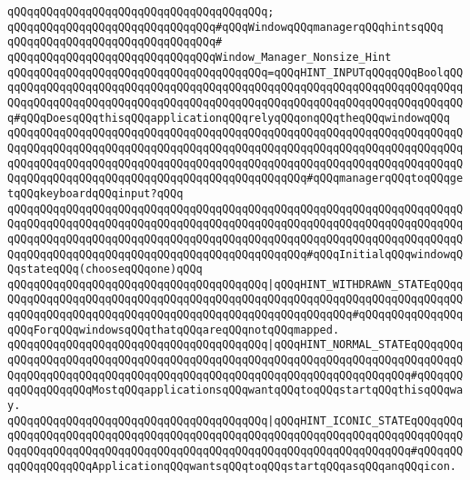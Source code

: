 \verb|qQQqqQQqqQQqqQQqqQQqqQQqqQQqqQQqqQQqqQQq;|\newline
\newline
\newline
\verb|qQQqqQQqqQQqqQQqqQQqqQQqqQQqqQQq#qQQqWindowqQQqmanagerqQQqhintsqQQq|\newline
\verb|qQQqqQQqqQQqqQQqqQQqqQQqqQQqqQQq#|\newline
\verb|qQQqqQQqqQQqqQQqqQQqqQQqqQQqqQQqWindow_Manager_Nonsize_Hint|\newline
\verb|qQQqqQQqqQQqqQQqqQQqqQQqqQQqqQQqqQQqqQQq=qQQqHINT_INPUTqQQqqQQqBoolqQQqqQQqqQQqqQQqqQQqqQQqqQQqqQQqqQQqqQQqqQQqqQQqqQQqqQQqqQQqqQQqqQQqqQQqqQQqqQQqqQQqqQQqqQQqqQQqqQQqqQQqqQQqqQQqqQQqqQQqqQQqqQQqqQQqqQQqqQQqqQQq#qQQqDoesqQQqthisqQQqapplicationqQQqrelyqQQqonqQQqtheqQQqwindowqQQq|\newline
\verb|qQQqqQQqqQQqqQQqqQQqqQQqqQQqqQQqqQQqqQQqqQQqqQQqqQQqqQQqqQQqqQQqqQQqqQQqqQQqqQQqqQQqqQQqqQQqqQQqqQQqqQQqqQQqqQQqqQQqqQQqqQQqqQQqqQQqqQQqqQQqqQQqqQQqqQQqqQQqqQQqqQQqqQQqqQQqqQQqqQQqqQQqqQQqqQQqqQQqqQQqqQQqqQQqqQQqqQQqqQQqqQQqqQQqqQQqqQQqqQQqqQQqqQQqqQQqqQQq#qQQqmanagerqQQqtoqQQqgetqQQqkeyboardqQQqinput?qQQq|\newline
\verb|qQQqqQQqqQQqqQQqqQQqqQQqqQQqqQQqqQQqqQQqqQQqqQQqqQQqqQQqqQQqqQQqqQQqqQQqqQQqqQQqqQQqqQQqqQQqqQQqqQQqqQQqqQQqqQQqqQQqqQQqqQQqqQQqqQQqqQQqqQQqqQQqqQQqqQQqqQQqqQQqqQQqqQQqqQQqqQQqqQQqqQQqqQQqqQQqqQQqqQQqqQQqqQQqqQQqqQQqqQQqqQQqqQQqqQQqqQQqqQQqqQQqqQQqqQQqqQQq#qQQqInitialqQQqwindowqQQqstateqQQq(chooseqQQqone)qQQq|\newline
\verb|qQQqqQQqqQQqqQQqqQQqqQQqqQQqqQQqqQQqqQQq|\verb#|qQQqHINT_WITHDRAWN_STATEqQQqqQQqqQQqqQQqqQQqqQQqqQQqqQQqqQQqqQQqqQQqqQQqqQQqqQQqqQQqqQQqqQQqqQQqqQQqqQQqqQQqqQQqqQQqqQQqqQQqqQQqqQQqqQQqqQQqqQQqqQQqqQQq#\verb|#qQQqqQQqqQQqqQQqqQQqForqQQqwindowsqQQqthatqQQqareqQQqnotqQQqmapped.|\newline
\verb|qQQqqQQqqQQqqQQqqQQqqQQqqQQqqQQqqQQqqQQq|\verb#|qQQqHINT_NORMAL_STATEqQQqqQQqqQQqqQQqqQQqqQQqqQQqqQQqqQQqqQQqqQQqqQQqqQQqqQQqqQQqqQQqqQQqqQQqqQQqqQQqqQQqqQQqqQQqqQQqqQQqqQQqqQQqqQQqqQQqqQQqqQQqqQQqqQQqqQQqqQQq#\verb|#qQQqqQQqqQQqqQQqqQQqMostqQQqapplicationsqQQqwantqQQqtoqQQqstartqQQqthisqQQqway.|\newline
\verb|qQQqqQQqqQQqqQQqqQQqqQQqqQQqqQQqqQQqqQQq|\verb#|qQQqHINT_ICONIC_STATEqQQqqQQqqQQqqQQqqQQqqQQqqQQqqQQqqQQqqQQqqQQqqQQqqQQqqQQqqQQqqQQqqQQqqQQqqQQqqQQqqQQqqQQqqQQqqQQqqQQqqQQqqQQqqQQqqQQqqQQqqQQqqQQqqQQqqQQqqQQq#\verb|#qQQqqQQqqQQqqQQqqQQqApplicationqQQqwantsqQQqtoqQQqstartqQQqasqQQqanqQQqicon.|\newline
